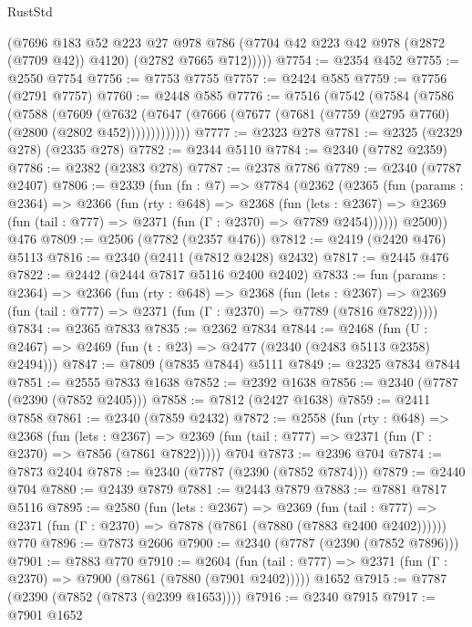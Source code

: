 \begin{lexlean}{RustStd}
\begin{coremodule}
          (@7696
            @183
            @52
            @223
            @27
            @978
            @786
            (@7704 @42 @223 @42 @978 (@2872 (@7709 @42)) @4120)
            (@2782 @7665 @712)))))
@7754 := @2354 @452
@7755 := @2550 @7754
@7756 := @7753 @7755
@7757 := @2424 @585
@7759 := @7756 (@2791 @7757)
@7760 := @2448 @585
@7776 := @7516
    (@7542
      (@7584
        (@7586
          (@7588
            (@7609
              (@7632
                (@7647 (@7666 (@7677 (@7681 (@7759 (@2795 @7760) (@2800 (@2802 @452)))))))))))))
@7777 := @2323 @278
@7781 := @2325 (@2329 @278) (@2335 @278)
@7782 := @2344 @5110
@7784 := @2340 (@7782 @2359)
@7786 := @2382 (@2383 @278)
@7787 := @2378 @7786
@7789 := @2340 (@7787 @2407)
@7806 := @2339
    (fun (fn : @7) =>
    @7784
      (@2362
        (@2365
          (fun (params : @2364) =>
          @2366
            (fun (rty : @648) =>
            @2368
              (fun (lets : @2367) =>
              @2369 (fun (tail : @777) => @2371 (fun (Γ : @2370) => @7789 @2454))))))
        @2500))
    @476
@7809 := @2506 (@7782 (@2357 @476))
@7812 := @2419 (@2420 @476) @5113
@7816 := @2340 (@2411 (@7812 @2428) @2432)
@7817 := @2445 @476
@7822 := @2442 (@2444 @7817 @5116 @2400 @2402)
@7833 := fun (params : @2364) =>
  @2366
    (fun (rty : @648) =>
    @2368
      (fun (lets : @2367) =>
      @2369 (fun (tail : @777) => @2371 (fun (Γ : @2370) => @7789 (@7816 @7822)))))
@7834 := @2365 @7833
@7835 := @2362 @7834
@7844 := @2468 (fun (U : @2467) => @2469 (fun (t : @23) => @2477 (@2340 (@2483 @5113 @2358) @2494)))
@7847 := @7809 (@7835 @7844) @5111
@7849 := @2325 @7834 @7844
@7851 := @2555 @7833 @1638
@7852 := @2392 @1638
@7856 := @2340 (@7787 (@2390 (@7852 @2405)))
@7858 := @7812 (@2427 @1638)
@7859 := @2411 @7858
@7861 := @2340 (@7859 @2432)
@7872 := @2558
    (fun (rty : @648) =>
    @2368
      (fun (lets : @2367) =>
      @2369 (fun (tail : @777) => @2371 (fun (Γ : @2370) => @7856 (@7861 @7822)))))
    @704
@7873 := @2396 @704
@7874 := @7873 @2404
@7878 := @2340 (@7787 (@2390 (@7852 @7874)))
@7879 := @2440 @704
@7880 := @2439 @7879
@7881 := @2443 @7879
@7883 := @7881 @7817 @5116
@7895 := @2580
    (fun (lets : @2367) =>
    @2369
      (fun (tail : @777) => @2371 (fun (Γ : @2370) => @7878 (@7861 (@7880 (@7883 @2400 @2402))))))
    @770
@7896 := @7873 @2606
@7900 := @2340 (@7787 (@2390 (@7852 @7896)))
@7901 := @7883 @770
@7910 := @2604
    (fun (tail : @777) => @2371 (fun (Γ : @2370) => @7900 (@7861 (@7880 (@7901 @2402)))))
    @1652
@7915 := @7787 (@2390 (@7852 (@7873 (@2399 @1653))))
@7916 := @2340 @7915
@7917 := @7901 @1652

\end{coremodule}
\end{lexlean}
